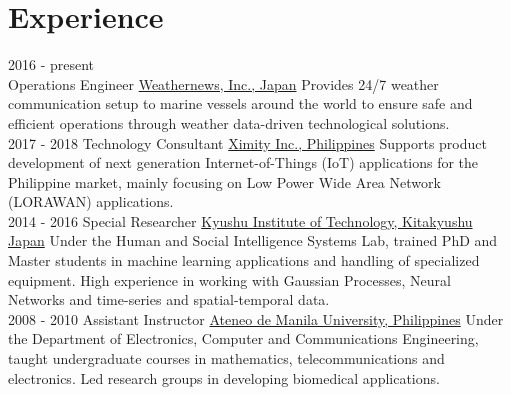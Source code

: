 \documentclass[]{friggeri-cv}
\begin{document}
\section{Experience}
\begin{entrylist}
  \entry
    {2016 - present\\}
    {Operations Engineer}
    {\href{{https://global.weathernews.com/your-industry/shipping/}}{{Weathernews, Inc., Japan}}}
    {Provides 24/7 weather communication setup to marine vessels around the world to ensure safe and efficient operations through weather data-driven technological solutions.
    \\}
  \entry
    {2017 - 2018}
    {Technology Consultant}
    {\href{{ https://ximity.net/}}{{Ximity Inc., Philippines}}}
    {Supports product development of next generation Internet-of-Things (IoT) applications for the Philippine market, mainly focusing on Low Power Wide Area Network (LORAWAN) applications.
    \\}
  \entry
    {2014 - 2016}
    {Special Researcher}
    {\href{{http://www.brain.kyutech.ac.jp/~tom/member/}}{{Kyushu Institute of Technology, Kitakyushu Japan}}}
    {Under the Human and Social Intelligence Systems Lab, trained PhD and Master students in machine learning applications and handling of specialized equipment. High experience in working with Gaussian Processes, Neural Networks and time-series and spatial-temporal data.
    \\}
  \entry
    {2008 - 2010}
    {Assistant Instructor}
    {\href{{https://www.ateneo.edu/ls/sose}}{{Ateneo de Manila University, Philippines}}}
    {Under the Department of Electronics, Computer and Communications Engineering, taught undergraduate courses in mathematics, telecommunications and electronics. Led research groups in developing biomedical applications.
    }
\end{entrylist}

\\\\
\end{document}
